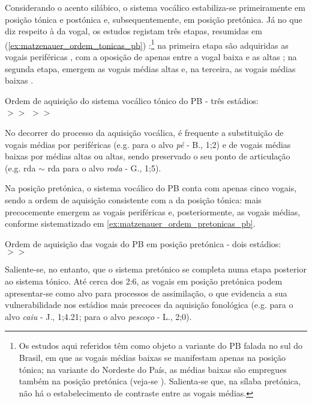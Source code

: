 \documentclass[output=paper]{LSP/langsci}
\begin{document}
Considerando o acento silábico, o sistema vocálico estabiliza-se primeiramente em posição tónica e postónica e, subsequentemente, em posição pretónica. Já no que diz respeito à  da vogal, os estudos registam três etapas, resumidas em (\ref{ex:matzenauer_ordem_tonicas_pb}) \citep{rangel2002,matzenauermiranda2009}:\footnote{Os estudos aqui referidos têm como objeto a variante do PB falada no sul do Brasil, em que as vogais médias baixas  se manifestam apenas na posição tónica; na variante do Nordeste do País, as médias baixas são empregues também na posição pretónica (veja-se \citealt{vogeley2011}). Salienta-se que, na sílaba pretónica, não há o estabelecimento de contraste entre as vogais médias.} na primeira etapa são adquiridas as vogais periféricas , com a oposição de  apenas entre a vogal baixa  e as altas ; na segunda etapa, emergem as vogais médias altas  e, na terceira, as vogais médias baixas .

\begin{exe}
\ex\label{ex:matzenauer_ordem_tonicas_pb} Ordem de aquisição do sistema vocálico tónico do PB - três estádios:\\ $>>$  $>>$ 
\end{exe}

No decorrer do processo da aquisição vocálica, é frequente a substituição de vogais médias por periféricas (e.g. \textipa{[\textprimstress pa]} para o alvo \textit{pé} - B., 1;2) e de vogais médias baixas por médias altas ou altas, sendo preservado o seu ponto de articulação (e.g. r\textipa{[o]}da $\sim$ r\textipa{[u]}da para o alvo \textit{roda} - G., 1;5).

Na posição pretónica, o sistema vocálico do PB conta com apenas cinco vogais, sendo a ordem de aquisição consistente com a da posição tónica: mais precocemente emergem as vogais periféricas e, posteriormente, as vogais médias, conforme sistematizado em \ref{ex:matzenauer_ordem_pretonicas_pb}.

\begin{exe}
\ex\label{ex:matzenauer_ordem_pretonicas_pb} Ordem de aquisição das vogais do PB em posição pretónica - dois estádios:\\ $>>$ 
\end{exe}

Saliente-se, no entanto, que o sistema pretónico se completa numa etapa posterior ao sistema tónico. Até cerca dos 2:6, as vogais em posição pretónica podem apresentar-se como alvo para processos de assimilação, o que evidencia a sua vulnerabilidade nos estádios mais precoces da aquisição fonológica (e.g. \textipa{[ki\textprimstress iw]} para o alvo \textit{caiu} - J., 1;4.21;  para o alvo \textit{pescoço} - L., 2;0).
\end{document}
